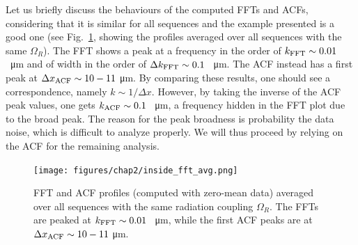 Let us briefly discuss the behaviours of the computed FFTs and ACFs, considering that it is similar for all sequences and the example presented is a good one (see Fig.\ \ref{fig:inside_avg}, showing the profiles averaged over all sequences with the same $\Omega_R$). The FFT shows a peak at a frequency in the order of $k_{\rm FFT} \sim 0.01$ \unit{\per\micro\meter} and of width in the order of $\Delta k_{\rm FFT} \sim 0.1$ \unit{\per\micro\meter}. The ACF instead has a first peak at $\Delta x_{\rm ACF} \sim 10-11$ \unit{\micro\meter}. By comparing these results, one should see a correspondence, namely $k \sim 1/\Delta x$. However, by taking the inverse of the ACF peak values, one gets $k_{\rm ACF} \sim 0.1$ \unit{\per\micro\meter}, a frequency hidden in the FFT plot due to the broad peak. The reason for the peak broadness is probability the data noise, which is difficult to analyze properly. We will thus proceed by relying on the ACF for the remaining analysis.

\begin{figure}[t!]
    \centering
    \texttt{[image: figures/chap2/inside\_fft\_avg.png]}
    \caption{FFT and ACF profiles (computed with zero-mean data) averaged over all sequences with the same radiation coupling $\Omega_R$. The FFTs are peaked at $k_{\rm FFT} \sim 0.01$ \unit{\per\micro\meter}, while the first ACF peaks are at $\Delta x_{\rm ACF} \sim 10-11$ \unit{\micro\meter}.}
    \label{fig:inside_avg}
\end{figure}

